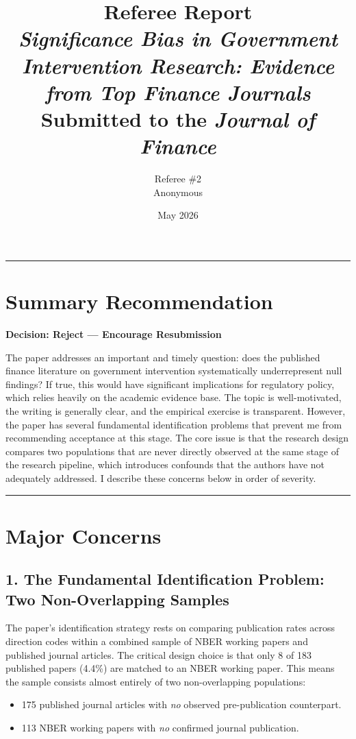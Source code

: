 \documentclass[12pt]{article}
\title{\textbf{Referee Report} \\[6pt]
       \large\textit{Significance Bias in Government Intervention Research:
       Evidence from Top Finance Journals} \\[6pt]
       \normalsize Submitted to the \textit{Journal of Finance}}
\author{Referee \#2 \\ Anonymous}
\date{May 2026}
\begin{document}
\maketitle
\thispagestyle{empty}

\noindent\rule{\linewidth}{0.4pt}

\section*{Summary Recommendation}

\textbf{Decision: Reject --- Encourage Resubmission}

The paper addresses an important and timely question: does the published
finance literature on government intervention systematically underrepresent
null findings?  If true, this would have significant implications for
regulatory policy, which relies heavily on the academic evidence base.  The
topic is well-motivated, the writing is generally clear, and the empirical
exercise is transparent.  However, the paper has several fundamental
identification problems that prevent me from recommending acceptance at this
stage.  The core issue is that the research design compares two populations
that are never directly observed at the same stage of the research pipeline,
which introduces confounds that the authors have not adequately addressed.
I describe these concerns below in order of severity.

\noindent\rule{\linewidth}{0.4pt}

\section{Major Concerns}

\subsection*{1. The Fundamental Identification Problem: Two Non-Overlapping Samples}

The paper's identification strategy rests on comparing publication rates
across direction codes within a combined sample of NBER working papers and
published journal articles.  The critical design choice is that only 8 of
183 published papers (4.4\%) are matched to an NBER working paper.  This
means the sample consists almost entirely of two non-overlapping populations:

\begin{itemize}
  \item 175 published journal articles with \emph{no} observed pre-publication
        counterpart.
  \item 113 NBER working papers with \emph{no} confirmed journal publication.
\end{itemize}
\end{document}
